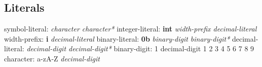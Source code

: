 \documentclass{article}
\begin{document}
  \subsection{Literals}  
  symbol-literal:\newline
  \indent \textit{character character*}\newline
  integer-literal:\newline
  \indent \textbf{int} \textit{width-prefix decimal-literal}\newline
  width-prefix:\newline
  \indent \textbf{i} \textit{decimal-literal}\newline
  binary-literal:\newline
  \indent \textbf{0b} \textit{binary-digit binary-digit*}\newline
  decimal-literal:\newline
  \indent \textit{decimal-digit decimal-digit*}\newline
  binary-digit:\newline
   1\newline
  decimal-digit\newline
   1 2 3 4 5 6 7 8 9\newline
  character:\newline
  \indent a-zA-Z \textit{decimal-digit}\newline
  
\end{document}
